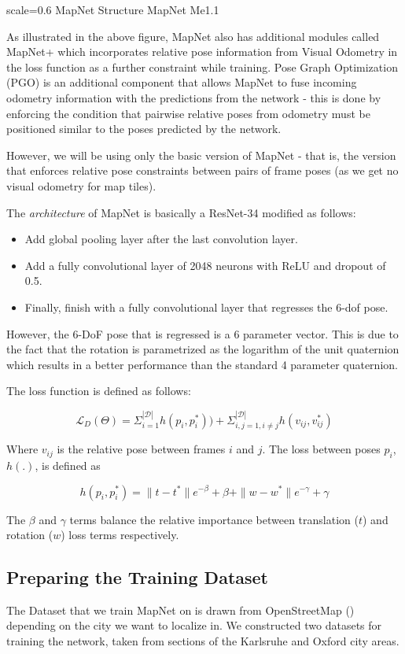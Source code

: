 {scale=0.6}%
{MapNet Structure}%
{MapNet}%
{Me1.1}

As illustrated in the above figure, MapNet also has additional modules called MapNet+ which incorporates relative pose information from Visual Odometry in the loss function as a further constraint while training. Pose Graph Optimization (PGO) is an additional component that allows MapNet to fuse incoming odometry information with the predictions from the network - this is done by enforcing the condition that pairwise relative poses from odometry must be positioned similar to the poses predicted by the network.

However, we will be using only the basic version of MapNet - that is, the version 
that enforces relative pose constraints between pairs of frame poses (as we get no visual odometry for map tiles).

The \textit{architecture} of MapNet is basically a ResNet-34 modified as follows:
\begin{itemize}
	\item Add global pooling layer after the last convolution layer.
	\item Add a fully convolutional layer of 2048 neurons with ReLU and dropout of 0.5.
	\item Finally, finish with a fully convolutional layer that regresses the 6-dof pose. 
\end{itemize} 

However, the 6-DoF pose that is regressed is a 6 parameter vector. This is due to the fact that the rotation is parametrized as the logarithm of the unit quaternion which results in a better performance than the standard 4 parameter quaternion. 

The loss function is defined as follows:

\[ \mathcal{L}_D(\Theta)= \Sigma_{i=1}^{|\mathcal{D}|}h(p_i,p_i^{*})) + \Sigma_{i,j=1, i\neq j}^{|\mathcal{D}|}h(v_{ij},v_{ij}^{*}) \] 

Where $v_{ij}$ is the relative pose between frames $i$ and $j$. The loss between poses $p_i$, $h(.)$, is defined as

\[ h(p_i,p_i^{*}) = \|t - t^*\|e^{-\beta} + \beta + \|w - w^*\|e^{-\gamma} + \gamma \]

The $\beta$ and $\gamma$ terms balance the relative importance between translation ($t$) and rotation ($w$) loss terms respectively. 

\subsection{Preparing the Training Dataset}
The Dataset that we train MapNet on is drawn from OpenStreetMap (\cite{osm2017}) depending on the city we want to localize in. We constructed two datasets for training the network, taken from sections of the Karlsruhe and Oxford city areas.

